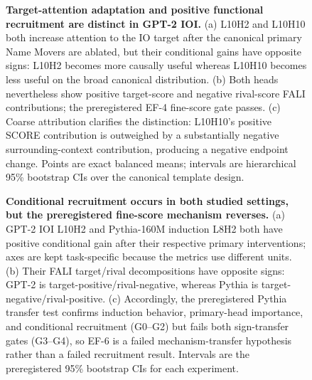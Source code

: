\begin{figure}[t]
  \centering
  \caption{\textbf{Target-attention adaptation and positive functional recruitment are distinct in GPT-2 IOI.}
  (a) L10H2 and L10H10 both increase attention to the IO target after the canonical primary Name Movers are ablated, but their conditional gains have opposite signs: L10H2 becomes more causally useful whereas L10H10 becomes less useful on the broad canonical distribution.
  (b) Both heads nevertheless show positive target-score and negative rival-score FALI contributions; the preregistered EF-4 fine-score gate passes.
  (c) Coarse attribution clarifies the distinction: L10H10's positive SCORE contribution is outweighed by a substantially negative surrounding-context contribution, producing a negative endpoint change.
  Points are exact balanced means; intervals are hierarchical 95\% bootstrap CIs over the canonical template design.}
  \label{fig:gpt2-attention-recruitment}
\end{figure}

\begin{figure}[t]
  \centering
  \caption{\textbf{Conditional recruitment occurs in both studied settings, but the preregistered fine-score mechanism reverses.}
  (a) GPT-2 IOI L10H2 and Pythia-160M induction L8H2 both have positive conditional gain after their respective primary interventions; axes are kept task-specific because the metrics use different units.
  (b) Their FALI target/rival decompositions have opposite signs: GPT-2 is target-positive/rival-negative, whereas Pythia is target-negative/rival-positive.
  (c) Accordingly, the preregistered Pythia transfer test confirms induction behavior, primary-head importance, and conditional recruitment (G0--G2) but fails both sign-transfer gates (G3--G4), so EF-6 is a failed mechanism-transfer hypothesis rather than a failed recruitment result.
  Intervals are the preregistered 95\% bootstrap CIs for each experiment.}
  \label{fig:cross-setting-reversal}
\end{figure}
